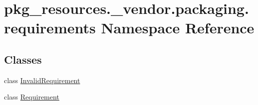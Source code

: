 \hypertarget{namespacepkg__resources_1_1__vendor_1_1packaging_1_1requirements}{}\section{pkg\+\_\+resources.\+\_\+vendor.\+packaging.\+requirements Namespace Reference}
\label{namespacepkg__resources_1_1__vendor_1_1packaging_1_1requirements}
\subsection*{Classes}
\begin{DoxyCompactItemize}
\item 
class \hyperlink{classpkg__resources_1_1__vendor_1_1packaging_1_1requirements_1_1_invalid_requirement}{Invalid\+Requirement}
\item 
class \hyperlink{classpkg__resources_1_1__vendor_1_1packaging_1_1requirements_1_1_requirement}{Requirement}
\end{DoxyCompactItemize}
